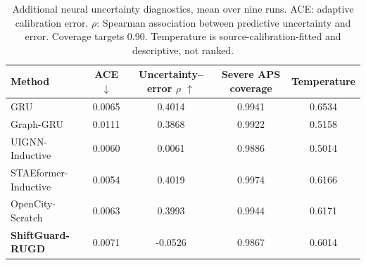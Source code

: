 \begin{table}[t]
\centering
\caption{Additional neural uncertainty diagnostics, mean over nine runs. ACE: adaptive calibration error. $\rho$: Spearman association between predictive uncertainty and error. Coverage targets 0.90. Temperature is source-calibration-fitted and descriptive, not ranked.}
\label{tab:diagnostics}
\begin{tabular}{lcccc}
\toprule
Method & ACE $\downarrow$ & Uncertainty--error $\rho$ $\uparrow$ & Severe APS coverage & Temperature \\
\midrule
GRU & 0.0065 & 0.4014 & 0.9941 & 0.6534 \\
Graph-GRU & 0.0111 & 0.3868 & 0.9922 & 0.5158 \\
UIGNN-Inductive & 0.0060 & 0.0061 & 0.9886 & 0.5014 \\
STAEformer-Inductive & 0.0054 & 0.4019 & 0.9974 & 0.6166 \\
OpenCity-Scratch & 0.0063 & 0.3993 & 0.9944 & 0.6171 \\
\textbf{ShiftGuard-RUGD} & 0.0071 & -0.0526 & 0.9867 & 0.6014 \\
\bottomrule
\end{tabular}
\end{table}
